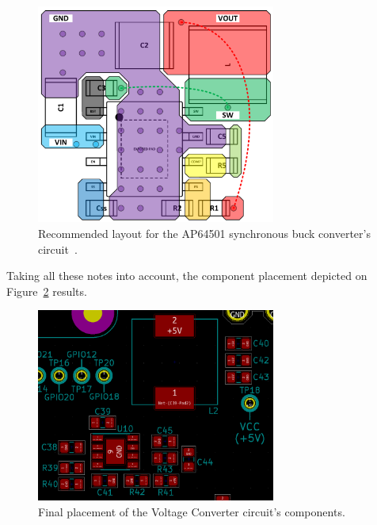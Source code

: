\begin{figure}[h]
	\centering
	\includegraphics[width=0.7\textwidth]{Chapters/Figures/chapter5/AP64501_layout_Datasheet.pdf}
	\caption{Recommended layout for the AP64501 synchronous buck converter's circuit~\cite{AP64501}.}
	\label{fig:AP64501_layout_Datasheet}
\end{figure}

Taking all these notes into account, the component placement depicted on Figure~\ref{fig:placement_VoltageConverter} results.

\begin{figure}[h]
	\centering
	\includegraphics[width=0.7\textwidth]{Chapters/Figures/chapter5/placement_VoltageConverter.png}
	\caption{Final placement of the Voltage Converter circuit's components.}
	\label{fig:placement_VoltageConverter}
\end{figure}%


